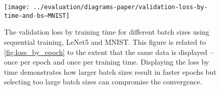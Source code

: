 \documentclass[conference,compsoc,a4paper]{IEEEtran}
\begin{document}






\begin{figure}[!t]
\centering
\texttt{[image: ../evaluation/diagrams-paper/validation-loss-by-time-and-bs--MNIST]}
\caption{The validation loss by training time for different batch sizes using sequential training, LeNet5 and MNIST.
This figure is related to \autoref{fig:loss_by_epoch} to the extent that the same data is displayed -- once per epoch and once per training time.
Displaying the loss by time demonstrates how larger batch sizes result in faster epochs but selecting too large batch sizes can compromise the convergence.}
\label{fig:loss_by_time}
\end{figure}
\end{document}
